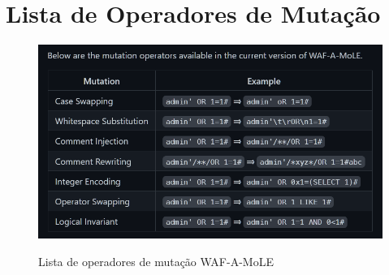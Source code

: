 {\let\clearpage\relax \chapter{\textnormal{Lista de Operadores de Mutação}}}

\begin{figure}[ht]
    \centering
    \caption{Lista de operadores de mutação WAF-A-MoLE}
    \includegraphics[width=16cm]{figuras/mutation_operators_wafamole.png}
    \label{fig:internet} 
\end{figure}




